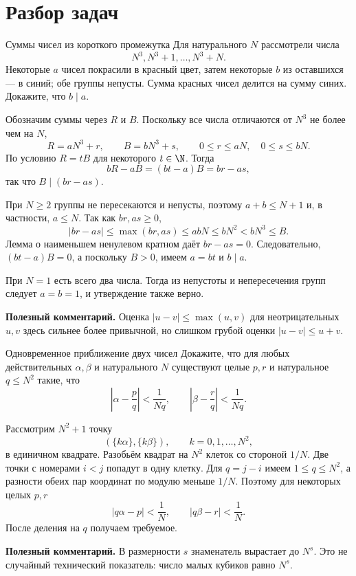 \section{Разбор задач}

\begin{problembox}{Суммы чисел из короткого промежутка}
Для натурального $N$ рассмотрели числа
\[
  N^3,N^3+1,\ldots,N^3+N.
\]
Некоторые $a$ чисел покрасили в красный цвет, затем некоторые $b$
из оставшихся --- в синий; обе группы непусты. Сумма красных чисел
делится на сумму синих. Докажите, что $b\mid a$.
\end{problembox}

\begin{solutionbox}
Обозначим суммы через $R$ и $B$. Поскольку все числа отличаются от
$N^3$ не более чем на $N$,
\[
  R=aN^3+r,\qquad B=bN^3+s,
  \qquad 0\le r\le aN,\quad 0\le s\le bN.
\]
По условию $R=tB$ для некоторого $t\in\N$. Тогда
\[
  bR-aB=(bt-a)B=br-as,
\]
так что $B\mid(br-as)$.

При $N\ge2$ группы не пересекаются и непусты, поэтому
$a+b\le N+1$ и, в частности, $a\le N$. Так как $br,as\ge0$,
\[
  |br-as|\le\max(br,as)\le abN\le bN^2<bN^3\le B.
\]
Лемма о наименьшем ненулевом кратном даёт $br-as=0$. Следовательно,
$(bt-a)B=0$, а поскольку $B>0$, имеем $a=bt$ и $b\mid a$.

При $N=1$ есть всего два числа. Тогда из непустоты и непересечения
групп следует $a=b=1$, и утверждение также верно.

\textbf{Полезный комментарий.}
Оценка $|u-v|\le\max(u,v)$ для неотрицательных $u,v$ здесь сильнее
более привычной, но слишком грубой оценки $|u-v|\le u+v$.
\end{solutionbox}

\begin{problembox}{Одновременное приближение двух чисел}
Докажите, что для любых действительных $\alpha,\beta$ и натурального
$N$ существуют целые $p,r$ и натуральное $q\le N^2$ такие, что
\[
  \left|\alpha-\frac pq\right|<\frac1{Nq},
  \qquad
  \left|\beta-\frac rq\right|<\frac1{Nq}.
\]
\end{problembox}

\begin{solutionbox}
Рассмотрим $N^2+1$ точку
\[
  (\{k\alpha\},\{k\beta\}),
  \qquad k=0,1,\ldots,N^2,
\]
в единичном квадрате. Разобьём квадрат на $N^2$ клеток со стороной
$1/N$. Две точки с номерами $i<j$ попадут в одну клетку. Для
$q=j-i$ имеем $1\le q\le N^2$, а разности обеих пар координат по
модулю меньше $1/N$. Поэтому для некоторых целых $p,r$
\[
  |q\alpha-p|<\frac1N,
  \qquad
  |q\beta-r|<\frac1N.
\]
После деления на $q$ получаем требуемое.

\textbf{Полезный комментарий.}
В размерности $s$ знаменатель вырастает до $N^s$. Это не случайный
технический показатель: число малых кубиков равно $N^s$.
\end{solutionbox}

